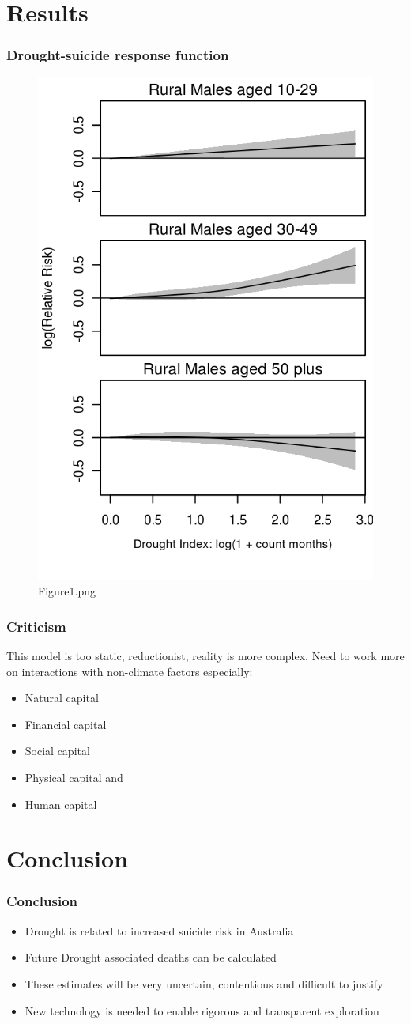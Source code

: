 \documentclass[bigger]{beamer}
\begin{document}
\section{Results}
\label{sec-3}
\begin{frame}
\frametitle{Drought-suicide response function}
\label{sec-3-1}

\begin{figure}[!h]
\centering
\includegraphics[width=.5\textwidth]{Figure1.png}
\caption{Figure1.png}
\label{fig:Figure1.png}
\end{figure}
\end{frame}
\begin{frame}
\frametitle{Criticism}
\label{sec-3-2}

This model is too static, reductionist, reality is more complex. Need to work more on interactions with non-climate factors especially: 
\begin{itemize}
\item Natural capital
\item Financial capital
\item Social capital
\item Physical capital and
\item Human capital
\end{itemize}
\end{frame}
\section{Conclusion}
\label{sec-4}
\begin{frame}
\frametitle{Conclusion}
\label{sec-4-1}

\begin{itemize}
\item Drought is related to increased suicide risk in Australia
\item Future Drought associated deaths can be calculated
\item These estimates will be very uncertain, contentious and difficult to justify
\item New technology is needed to enable rigorous and transparent exploration
\end{itemize}
\end{frame}
\end{document}
